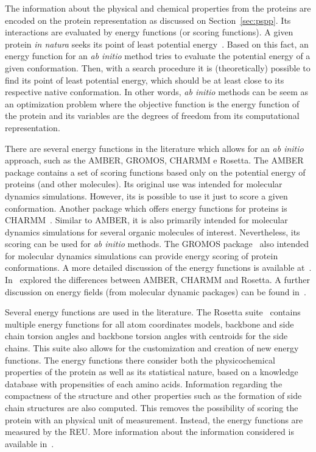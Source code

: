The information about the physical and chemical properties from the proteins
are encoded on the protein representation as discussed on
Section~\ref{sec:pspp}. Its interactions are evaluated by energy functions (or
scoring functions). A given protein \textit{in natura} seeks its point of least
potential energy~\cite{anfinsen1973principles}. Based on this fact, an energy
function for an \textit{ab initio} method tries to evaluate the potential
energy of a given conformation. Then, with a search procedure it is
(theoretically) possible to find its point of least potential energy, which
should be at least close to its respective native conformation. In other words,
\textit{ab initio} methods can be seem as an optimization problem where the
objective function is the energy function of the protein and its variables are
the degrees of freedom from its computational representation.

There are several energy functions in the literature which allows for an
\textit{ab initio} approach, such as the \ac{AMBER}, \ac{GROMOS}, \ac{CHARMM} e
Rosetta.  The \ac{AMBER}~\cite{salomon2013overview} package contains a set of
scoring functions based only on the potential energy of proteins (and other
molecules). Its original use was intended for molecular dynamics simulations.
However, its is possible to use it just to score a given conformation. Another
package which offers energy functions for proteins is
\ac{CHARMM}~\cite{brooks2009charmm}. Similar to \ac{AMBER}, it is also
primarily intended for molecular dynamics simulations for several organic
molecules of interest. Nevertheless, its scoring can be used for \textit{ab
initio} methods. The \ac{GROMOS} package~\cite{eichenberger2011gromos++} also
intended for molecular dynamics simulations can provide energy scoring of
protein conformations. A more detailed discussion of the energy functions is
available at~\cite{dorn2014three}. In~\cite{narloch2016diversification}
explored the differences between \ac{AMBER}, \ac{CHARMM} and Rosetta. A further
discussion on energy fields (from molecular dynamic packages) can be found
in~\cite{vlachakis2014current}.

Several energy functions are used in the literature. The Rosetta
suite~\cite{rohl2004protein,kaufmann2010practically} contains multiple energy
functions for all atom coordinates models, backbone and side chain torsion
angles and backbone torsion angles with centroids for the side chains. This
suite also allows for the customization and creation of new energy functions.
The energy functions there consider both the physicochemical properties of the
protein as well as its statistical nature, based on a knowledge database with
propensities of each amino acids. Information regarding the compactness of the
structure and other properties such as the formation of side chain structures
are also computed. This removes the possibility of scoring the protein with an
physical unit of measurement. Instead, the energy functions are measured by the
\ac{REU}. More information about the information considered is available
in~\cite{alford2017rosetta}.

